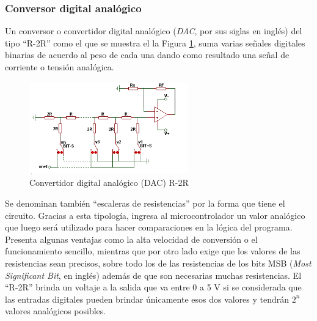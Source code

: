 \documentclass[a4paper]{article}
\begin{document}

\subsubsection*{Conversor digital analógico}

Un conversor o convertidor digital analógico (\textit{DAC}, por sus 
siglas en inglés) del tipo ``R-2R'' como el que se muestra el la 
Figura \ref{fig:conversor}, suma varias señales digitales binarias 
de acuerdo al peso de cada una dando como resultado una señal de 
corriente o tensión analógica.

\begin{figure}[h]\centering
    \includegraphics[height=4cm]{conversor.png}
    \caption{Convertidor digital analógico (DAC) R-2R}
    \label{fig:conversor}
\end{figure}

Se denominan también ``escaleras de resistencias'' por la forma que 
tiene el circuito. Gracias a esta tipología, ingresa al 
microcontrolador un valor analógico que luego será utilizado para hacer 
comparaciones en la lógica del programa. Presenta algunas 
ventajas como la alta velocidad de conversión o el funcionamiento 
sencillo, mientras que por otro lado exige que los valores de las 
resistencias sean precisos, sobre todo los de las resistencias de los
bits MSB (\textit{Most Significant Bit}, en inglés) además de que 
son necesarias muchas resistencias. El ``R-2R'' brinda un voltaje a 
la salida que va entre 0 a 5 V si se considerada que las entradas 
digitales pueden brindar únicamente esos dos valores y tendrán $2^n$ 
valores analógicos posibles.

\end{document}
